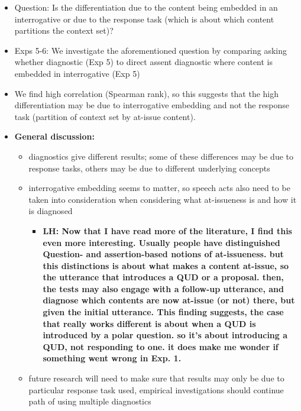 \documentclass[times,linguex,xcolor]{glossa}
\newcommand{\lh}[1]{\textbf{\color{Cerulean}LH: #1}}
\begin{document}
\begin{itemize}[leftmargin=12pt]
    \item Question: Is the differentiation due to the content being embedded in an interrogative or due to the response task (which is about which content partitions the context set)?

    \item Exps 5-6: We investigate the aforementioned question by comparing asking whether diagnostic (Exp 5) to direct assent diagnostic where content is embedded in interrogative (Exp 5)

    \item We find high correlation (Spearman rank), so this suggests that the high differentiation may be due to interrogative embedding and not the response task (partition of context set by at-issue content). 

    \item {\bf General discussion:} 

    \begin{itemize}

    \item diagnostics give different results; some of these differences may be due to response tasks, others may be due to different underlying concepts

    \item interrogative embedding seems to matter, so speech acts also need to be taken into consideration when considering what at-issueness is and how it is diagnosed

    \begin{itemize}
      \item \lh{Now that I have read more of the literature, I find this even more interesting. Usually people have distinguished Question- and assertion-based notions of at-issueness. but this distinctions is about what makes a content at-issue, so the utterance that introduces a QUD or a proposal. then, the tests may also engage with a follow-up utterance, and diagnose which contents are now at-issue (or not) there, but given the initial utterance. This finding suggests, the case that really works different is about when a QUD is introduced by a polar question. so it's about introducing a QUD, not responding to one. it does make me wonder if something went wrong in Exp. 1.}
    \end{itemize}

    \item future research will need to make sure that results may only be due to particular response task used, empirical investigations should continue path of using multiple diagnostics 

    \end{itemize}

  \end{itemize}
\end{document}
